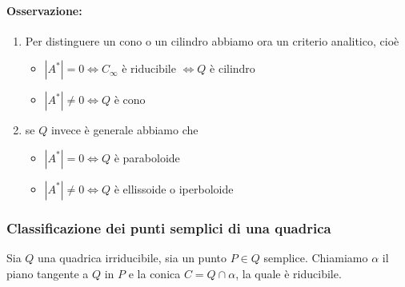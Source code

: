 \documentclass{report}
\begin{document}
\paragraph{Osservazione:}
\begin{enumerate}
    \item Per distinguere un cono o un cilindro abbiamo ora un criterio analitico, cioè 
        \begin{itemize}
            \item \(|A^{*}| = 0 \iff C_\infty \text{ è riducibile } \iff Q \text{ è cilindro }\) 
            \item \(|A^{*}| \neq 0 \iff Q \text{ è cono }\) 
        \end{itemize}
\item se \(Q\) invece è generale abbiamo che
    \begin{itemize}
        \item \(|A^{*}| = 0 \iff Q\) è paraboloide
        \item \(|A^{*}| \neq 0 \iff Q\) è ellissoide o iperboloide
    \end{itemize}
\end{enumerate}


\subsubsection{Classificazione dei punti semplici di una quadrica}
Sia \(Q\) una quadrica irriducibile, sia un punto \(P \in Q\) semplice. Chiamiamo \(\alpha \) il piano tangente a \(Q\) in \(P\) e la conica \(C = Q \cap \alpha \), la quale è riducibile.
\end{document}
